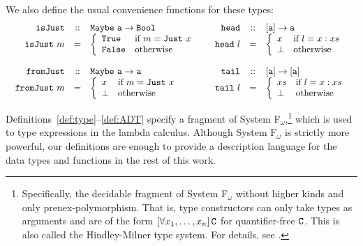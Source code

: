 \noindent
We also define the usual convenience functions for these types:
$$
\begin{array}{l l}
\begin{array}{r c l}
\mathtt{isJust} & :: & \mathtt{Maybe\ a \rightarrow Bool}\\
\mathtt{isJust}\ m & = & \left\{
\begin{array}{l l}
\mathtt{True} & \textnormal{if } m = \mathtt{Just}\ x\\
\mathtt{False} & \textnormal{otherwise}\\
\end{array}
\right.\\
\\
\mathtt{fromJust} & :: & \mathtt{Maybe\ a \rightarrow a}\\
\mathtt{fromJust}\ m & = & \left\{
\begin{array}{l l}
x & \textnormal{if } m = \mathtt{Just}\ x\\
\bot & \textnormal{otherwise}\\
\end{array}
\right.\\
\end{array}
&
\begin{array}{r c l}
\mathtt{head} & :: & \mathtt{[a] \rightarrow a}\\
\mathtt{head}\ l & = & \left\{
\begin{array}{l l}
x & \textnormal{if } l = x:xs\\
\bot & \textnormal{otherwise}\\
\end{array}
\right.\\
\\
\mathtt{tail} & :: & \mathtt{[a] \rightarrow [a]}\\
\mathtt{tail}\ l & = & \left\{
\begin{array}{l l}
xs & \textnormal{if } l = x:xs\\
\bot & \textnormal{otherwise}\\
\end{array}
\right.\\
\end{array}
\end{array}
$$

Definitions~\ref{def:type}--\ref{def:ADT} specify a fragment of System F$_\omega$,\footnote{Specifically, the decidable fragment of System F$_\omega$ without higher kinds and only prenex-polymorphism. That is, type constructors can only take types as arguments and are of the form $\left[\forall x_1,\dots,x_n \right] \mathtt{C}$ for quantifier-free $\mathtt{C}$. This is also called the Hindley-Milner type system. For details, see \cite{barendregt91}.} which is used to type expressions in the lambda calculus. Although System F$_\omega$ is strictly more powerful, our definitions are enough to provide a description language for the data types and functions in the rest of this work.



